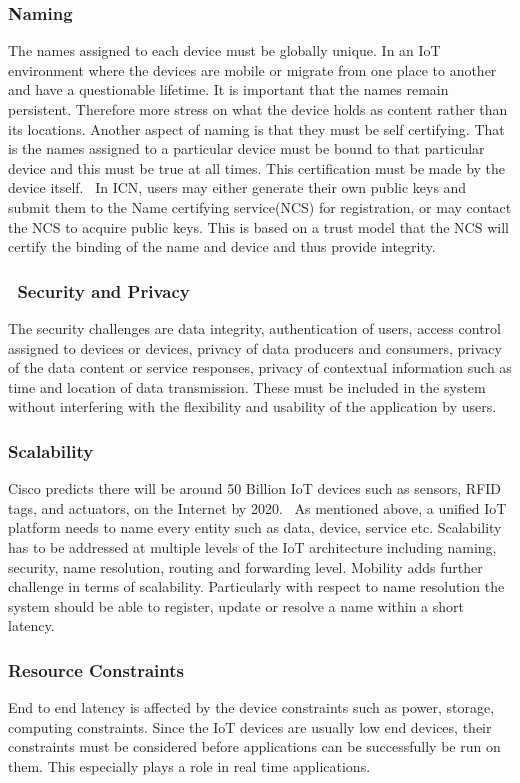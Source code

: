 \subsubsection{Naming}
The names assigned to each device must be globally unique. In an IoT environment where the devices are mobile or migrate from one place to another and have a questionable lifetime.
It is important that the names remain persistent. Therefore more stress on what the device holds as content rather than its locations. Another aspect of naming is that they must be self certifying. That is the names assigned to a particular device must be bound to that particular device and this must be true at all times. This certification must be made by the device itself. 
In ICN, users may either generate their own public keys and submit them to the Name certifying service(NCS) for registration, or may contact the NCS to acquire public keys. This is based on a trust model that the NCS will certify the binding of the name and device and thus provide integrity.
\subsubsection{ Security and Privacy
} The security challenges are data integrity, authentication of users, access control assigned to devices or devices, privacy of data producers and consumers, privacy of the data content or service responses, privacy of contextual information such as time and location of data transmission. These must be included in the system without interfering with the flexibility and usability of the application by users.
\subsubsection{Scalability
}Cisco predicts there will be around 50 Billion IoT devices such as sensors, RFID tags, and actuators, on the Internet by 2020.  As mentioned above, a unified IoT platform needs to name every entity such as data, device, service etc. Scalability has to be addressed at multiple levels of the IoT architecture including naming, security, name resolution, routing and forwarding level. Mobility adds further challenge in terms of scalability. Particularly with respect to name resolution the system should be able to register, update or resolve a name within a short latency. 
\subsubsection{Resource Constraints
} End to end latency is affected by the device constraints such as power, storage, computing constraints. Since the IoT devices are usually low end devices, their constraints must be considered before applications can be successfully be run on them. This especially plays a role in real time applications.
